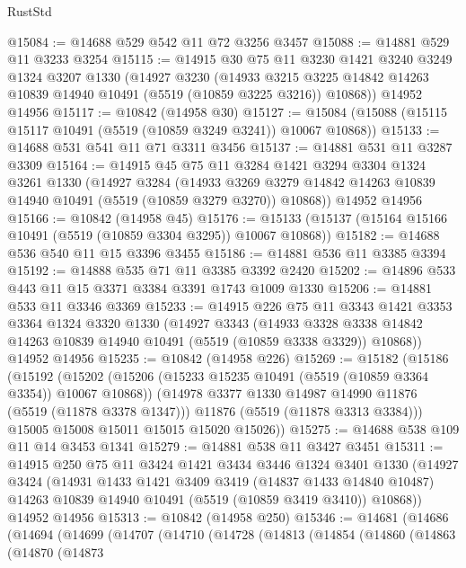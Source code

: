 \begin{lexlean}{RustStd}
\begin{coremodule}
@15084 := @14688 @529 @542 @11 @72 @3256 @3457
@15088 := @14881 @529 @11 @3233 @3254
@15115 := @14915
    @30
    @75
    @11
    @3230
    @1421
    @3240
    @3249
    @1324
    @3207
    @1330
    (@14927
      @3230
      (@14933 @3215 @3225 @14842 @14263 @10839 @14940 @10491 (@5519 (@10859 @3225 @3216)) @10868))
    @14952
    @14956
@15117 := @10842 (@14958 @30)
@15127 := @15084 (@15088 (@15115 @15117 @10491 (@5519 (@10859 @3249 @3241)) @10067 @10868))
@15133 := @14688 @531 @541 @11 @71 @3311 @3456
@15137 := @14881 @531 @11 @3287 @3309
@15164 := @14915
    @45
    @75
    @11
    @3284
    @1421
    @3294
    @3304
    @1324
    @3261
    @1330
    (@14927
      @3284
      (@14933 @3269 @3279 @14842 @14263 @10839 @14940 @10491 (@5519 (@10859 @3279 @3270)) @10868))
    @14952
    @14956
@15166 := @10842 (@14958 @45)
@15176 := @15133 (@15137 (@15164 @15166 @10491 (@5519 (@10859 @3304 @3295)) @10067 @10868))
@15182 := @14688 @536 @540 @11 @15 @3396 @3455
@15186 := @14881 @536 @11 @3385 @3394
@15192 := @14888 @535 @71 @11 @3385 @3392 @2420
@15202 := @14896 @533 @443 @11 @15 @3371 @3384 @3391 @1743 @1009 @1330
@15206 := @14881 @533 @11 @3346 @3369
@15233 := @14915
    @226
    @75
    @11
    @3343
    @1421
    @3353
    @3364
    @1324
    @3320
    @1330
    (@14927
      @3343
      (@14933 @3328 @3338 @14842 @14263 @10839 @14940 @10491 (@5519 (@10859 @3338 @3329)) @10868))
    @14952
    @14956
@15235 := @10842 (@14958 @226)
@15269 := @15182
    (@15186
      (@15192
        (@15202
          (@15206 (@15233 @15235 @10491 (@5519 (@10859 @3364 @3354)) @10067 @10868))
          (@14978 @3377 @1330 @14987 @14990 @11876 (@5519 (@11878 @3378 @1347)))
          @11876
          (@5519 (@11878 @3313 @3384)))
        @15005
        @15008
        @15011
        @15015
        @15020
        @15026))
@15275 := @14688 @538 @109 @11 @14 @3453 @1341
@15279 := @14881 @538 @11 @3427 @3451
@15311 := @14915
    @250
    @75
    @11
    @3424
    @1421
    @3434
    @3446
    @1324
    @3401
    @1330
    (@14927
      @3424
      (@14931
        @1433
        @1421
        @3409
        @3419
        (@14837 @1433 @14840 @10487)
        @14263
        @10839
        @14940
        @10491
        (@5519 (@10859 @3419 @3410))
        @10868))
    @14952
    @14956
@15313 := @10842 (@14958 @250)
@15346 := @14681
    (@14686
      (@14694
        (@14699
          (@14707
            (@14710
              (@14728
                (@14813
                  (@14854
                    (@14860
                      (@14863
                        (@14870
                          (@14873

\end{coremodule}
\end{lexlean}
